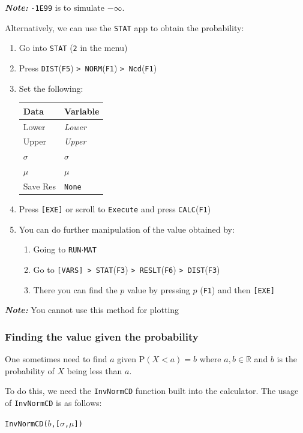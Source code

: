\documentclass[a5paper]{memoir}
\def\code#1{\texttt{#1}}
\def\note#1{\textcolor[HTML]{109fa9}{\textbf{\textit{Note:}}} #1}
\def\runmat{\code{RUN$\cdot$MAT} }
\def\Fone{(\code{F1}) }
\def\Fthree{(\code{F3}) }
\def\Ffive{(\code{F5}) }
\def\Fsix{(\code{F6}) }
\def\fone{(\code{F1})}
\newcommand{\addtoindex}[1]{#1\index{#1}}
\begin{document}
\note{\code{-1E99} is to simulate $-\infty$.}

Alternatively, we can use the \code{STAT} app to obtain the probability:
\begin{enumerate}
	\item Go into \code{STAT} (\code{2} in the menu)
	\item Press \code{DIST}\Ffive\code{> NORM}\Fone\code{> Ncd}\fone
	\item Set the following:
	\begin{center}
		\setlength{\tabcolsep}{10pt}
		\renewcommand{\arraystretch}{1.2}
		\begin{tabular}{|l|l|}
			\hline
			Data		& Variable \\
			\hline
			Lower		& \textit{Lower} \\
			\hline
			Upper		& \textit{Upper} \\
			\hline
			$\sigma$	& $\sigma$ \\
			\hline
			$\mu$		& $\mu$ \\
			\hline
			Save Res	& \code{None} \\
			\hline
		\end{tabular}
	\end{center}
	\item Press \code{[EXE]} or scroll to \code{Execute} and press \code{CALC}\Fone
	\item You can do further manipulation of the value obtained by:
	\begin{enumerate}
		\item Going to \runmat
		\item Go to \code{[VARS] > STAT}\Fthree \code{> RESLT}\Fsix\code{> DIST}\Fthree
		\item There you can find the $p$ value by pressing $p$ \Fone and then \code{[EXE]}
	\end{enumerate} 
\end{enumerate}
\note{You cannot use this method for plotting}

\subsubsection{Finding the value given the probability}
One sometimes need to find $a$ given $\textrm{P}(X < a) = b$ where $a,b \in \mathbb{R}$ and $b$ is the probability of $X$ being less than $a$. 

To do this, we need the \code{\addtoindex{InvNormCD}} function built into the calculator. The usage of \code{InvNormCD} is as follows:
\begin{center}
	\code{InvNormCD($b$,[$\sigma$,$\mu$])}
\end{center}
\end{document}
